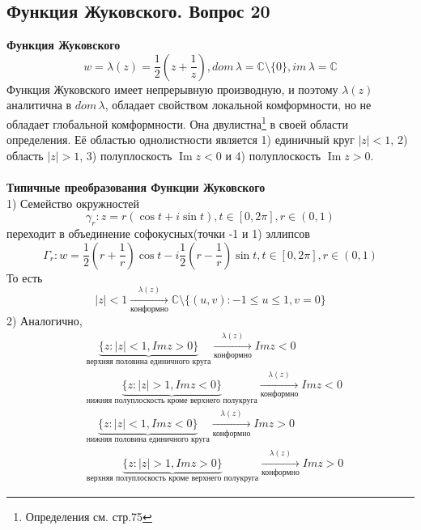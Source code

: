 \documentclass{article}
\begin{document}
\subsection{Функция Жуковского. Вопрос 20}
	\textbf{Функция Жуковского}
	\begin{equation}
	w=\lambda(z)=\frac{1}{2}(z+\frac{1}{z}), dom\,\lambda=\mathbb{C}\setminus \{0\},im\,\lambda=\mathbb{C}
	\end{equation}
	Функция Жуковского имеет непрерывную производную, и поэтому $\lambda(z)$ аналитична в $dom\,\lambda$, обладает свойством локальной комформности, но не обладает глобальной комформности. Она двулистна\footnote{Определения см. стр.75} в своей области определения. Её областью однолистности является 1) единичный круг $|z|<1$, 2) область $|z|>1$, 3) полуплоскость $\operatorname{Im}z<0$ и 4) полуплоскость $\operatorname{Im}z>0$.\\
	\\
	\textbf{Типичные преобразования Функции Жуковского}\\
	1) Семейство окружностей
	\begin{equation}
	{\gamma}_{r}:z=r(\cos t+i\sin t),t\in [0,2\pi],r\in (0,1)
	\end{equation}
	переходит в объединение софокусных(точки -1 и 1) эллипсов
	\begin{equation}
	{\Gamma}_{r}:w=\frac{1}{2}(r+\frac{1}{r})\cos t-i\frac{1}{2}(r-\frac{1}{r})\sin t,t\in [0,2\pi],r\in (0,1)
	\end{equation}
	То есть
	\begin{equation}
	|z|<1\xrightarrow[\text{конформно}]{\lambda(z)}\mathbb{C}\setminus \{(u,v):-1\le u\le1,v=0\}
	\end{equation}
	2) Аналогично,
	\begin{equation}
	\begin{aligned}
	&\underbrace{\{z:|z|<1,Im z>0\}}_{\textbf{верхняя половина единичного круга}}\xrightarrow[\text{конформно}]{\lambda(z)} Im z<0\\
	&\underbrace{\{z:|z|>1,Im z<0\}}_{\textbf{нижняя полуплоскость кроме верхнего полукруга}}\xrightarrow[\text{конформно}]{\lambda(z)} Im z<0\\
	&\underbrace{\{z:|z|<1,Im z<0\}}_{\textbf{нижняя половина единичного круга}}\xrightarrow[\text{конформно}]{\lambda(z)} Im z>0\\
	&\underbrace{\{z:|z|>1,Im z>0\}}_{\textbf{верхняя полуплоскость кроме верхнего полукруга}}\xrightarrow[\text{конформно}]{\lambda(z)} Im z>0
	\end{aligned}
	\end{equation}
\end{document}

